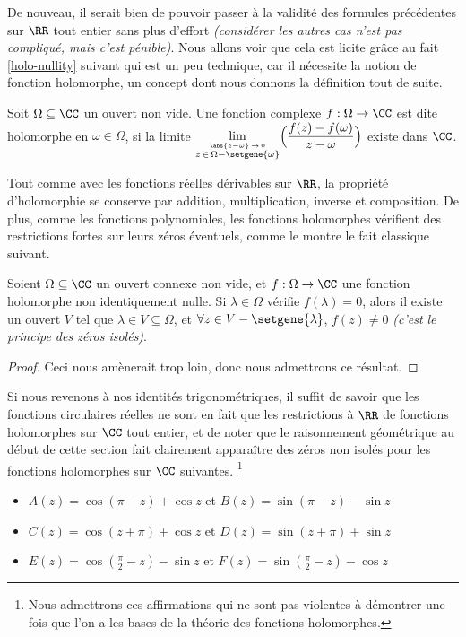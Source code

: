 De nouveau, il serait bien de pouvoir passer à la validité des formules précédentes sur $\RR$ tout entier sans plus d'effort \emph{(considérer les autres cas n'est pas compliqué, mais c'est pénible)}.
%
Nous allons voir que cela est licite grâce au fait \ref{holo-nullity} suivant qui est un peu technique, car il nécessite la notion de fonction holomorphe, un concept dont nous donnons la définition tout de suite.


\begin{defi}
    Soit $\Omega \subseteq \CC$ un ouvert non vide.
	Une fonction complexe $f: \Omega \rightarrow \CC$ est dite holomorphe en $\omega \in \Omega$, 
	si la limite 
	$\displaystyle \lim_{\stackrel{\abs{z - \omega} \, \rightarrow \, 0}{z \, \in \, \Omega - \setgene{\omega}}}\!\Big( \frac{f(z) - f(\omega)}{z - \omega} \Big)$
	existe dans $\CC$.
\end{defi}


\medskip

Tout comme avec les fonctions réelles dérivables sur $\RR$, la propriété d'holomorphie se conserve par addition, multiplication, inverse et composition.
De plus, comme les fonctions polynomiales, les fonctions holomorphes vérifient des restrictions fortes sur leurs zéros éventuels, comme le montre le fait classique suivant.

\begin{fact} \label{holo-nullity}
    Soient $\Omega \subseteq \CC$ un ouvert connexe non vide,
    et
    $f: \Omega \rightarrow \CC$ une fonction holomorphe non identiquement nulle.
	Si $\lambda \in \Omega$ vérifie $f(\lambda) = 0$,
	alors il existe un ouvert $V$ tel que 
	$\lambda \in V \subseteq \Omega$,
	et
	$\forall z \in V - \setgene{\lambda}$, $f(z) \neq 0$ 
	\emph{(c'est le principe des zéros isolés)}. 
\end{fact}


\begin{proof}
	Ceci nous amènerait trop loin, donc nous admettrons ce résultat.
\end{proof}


Si nous revenons à nos identités trigonométriques, il suffit de savoir que les fonctions circulaires réelles ne sont en fait que les restrictions à $\RR$ de fonctions holomorphes sur $\CC$ tout entier, et de noter que le raisonnement géométrique au début de cette section fait clairement apparaître des zéros non isolés pour les fonctions holomorphes sur $\CC$ suivantes.%
\footnote{
	Nous admettrons ces affirmations qui ne sont pas violentes à démontrer une fois que l'on a les bases de la théorie des fonctions holomorphes.
}
%
\begin{itemize}[label=\small\textbullet]
	\item $A(z) = \cos (\pi - z) + \cos z$ 
	   et $B(z) =\sin (\pi - z) - \sin z$ 

	\smallskip
	\item $C(z) =\cos (z + \pi) + \cos z$ 
	   et $D(z) =\sin (z + \pi) + \sin z$

	\smallskip
	\item $E(z) =\cos \left( \frac{\pi}{2} - z \right) - \sin z$ 
	   et $F(z) =\sin \left( \frac{\pi}{2} - z \right) - \cos z$ 
\end{itemize}


